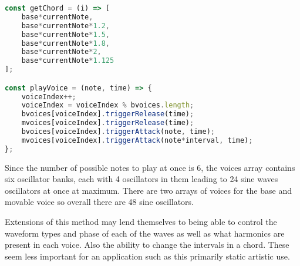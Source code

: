 \begin{lstlisting}[language=JavaScript]
const getChord = (i) => [
    base*currentNote,
    base*currentNote*1.2,
    base*currentNote*1.5,
    base*currentNote*1.8,
    base*currentNote*2,
    base*currentNote*1.125
];

const playVoice = (note, time) => {
    voiceIndex++;
    voiceIndex = voiceIndex % bvoices.length;
    bvoices[voiceIndex].triggerRelease(time);
    mvoices[voiceIndex].triggerRelease(time);
    bvoices[voiceIndex].triggerAttack(note, time);
    mvoices[voiceIndex].triggerAttack(note*interval, time);
};
\end{lstlisting}

Since the number of possible notes to play at once is 6, the voices array
contains six oscillator banks, each with 4 oscillators in them leading to 24
sine waves oscillators at once at maximum. There are two arrays of voices for
the base and movable voice so overall there are 48 sine oscillators.

Extensions of this method may lend themselves to being able to control the
waveform types and phase of each of the waves as well as what harmonics are
present in each voice. Also the ability to change the intervals in a chord.
These seem less important for an application such as this primarily static
artistic use.
